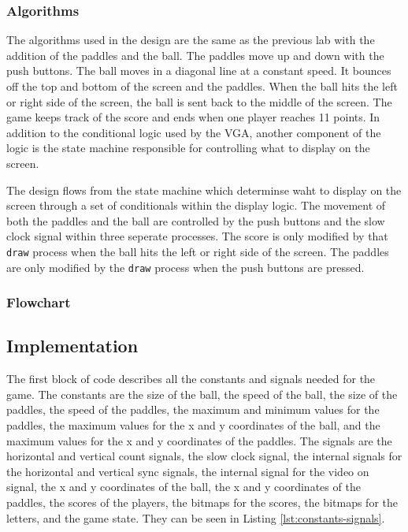 \documentclass{article}
\newcommand{\code}[1]{\lstinline|#1|}
\begin{document}
\subsubsection*{Algorithms}
The algorithms used in the design are the same as the previous lab with the addition of the paddles and the ball. The paddles move up and down with the push buttons. The ball moves in a diagonal line at a constant speed. It bounces off the top and bottom of the screen and the paddles. When the ball hits the left or right side of the screen, the ball is sent back to the middle of the screen. The game keeps track of the score and ends when one player reaches 11 points. In addition to the conditional logic used by the VGA, another component of the logic is the state machine responsible for controlling what to display on the screen.

The design flows from the state machine which determinse waht to display on the screen through a set of conditionals within the display logic. The movement of both the paddles and the ball are controlled by the push buttons and the slow clock signal within three seperate processes. The score is only modified by that \code{draw} process when the ball hits the left or right side of the screen. The paddles are only modified by the \code{draw} process when the push buttons are pressed.

\subsubsection*{Flowchart}

\subsection*{Implementation}
The first block of code describes all the constants and signals needed for the game. The constants are the size of the ball, the speed of the ball, the size of the paddles, the speed of the paddles, the maximum and minimum values for the paddles, the maximum values for the x and y coordinates of the ball, and the maximum values for the x and y coordinates of the paddles. The signals are the horizontal and vertical count signals, the slow clock signal, the internal signals for the horizontal and vertical sync signals, the internal signal for the video on signal, the x and y coordinates of the ball, the x and y coordinates of the paddles, the scores of the players, the bitmaps for the scores, the bitmaps for the letters, and the game state.
They can be seen in Listing \ref{lst:constants-signals}. 
\end{document}
